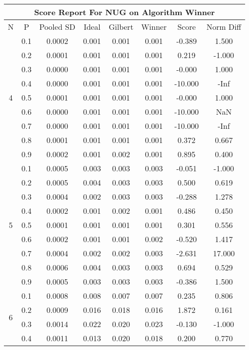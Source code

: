 \documentclass[11pt,a4paper]{report}
\begin{document}
\begin{longtable}{ | c | c || c | c | c | c | c | c | }
\hline
\multicolumn{8}{|c|}{ Score Report For NUG on Algorithm Winner} \\
\hline
N & P & Pooled SD &  Ideal &  Gilbert & Winner  & Score & Norm Diff \\
 \hline
 \hline
 \endhead
\multirow{9}{*}{4} & 0.1 & 0.0002 & 0.001 & 0.001 & 0.001 & -0.389 & 1.500 \\
 & 0.2 & 0.0001 & 0.001 & 0.001 & 0.001 & 0.219 & -1.000 \\
 & 0.3 & 0.0000 & 0.001 & 0.001 & 0.001 & -0.000 & 1.000 \\
 & 0.4 & 0.0000 & 0.001 & 0.001 & 0.001 & -10.000 & -Inf \\
 & 0.5 & 0.0001 & 0.001 & 0.001 & 0.001 & -0.000 & 1.000 \\
 & 0.6 & 0.0000 & 0.001 & 0.001 & 0.001 & -10.000 & NaN \\
 & 0.7 & 0.0000 & 0.001 & 0.001 & 0.001 & -10.000 & -Inf \\
 & 0.8 & 0.0001 & 0.001 & 0.001 & 0.001 & 0.372 & 0.667 \\
 & 0.9 & 0.0002 & 0.001 & 0.002 & 0.001 & 0.895 & 0.400 \\
 \hline
\multirow{9}{*}{5} & 0.1 & 0.0005 & 0.003 & 0.003 & 0.003 & -0.051 & -1.000 \\
 & 0.2 & 0.0005 & 0.004 & 0.003 & 0.003 & 0.500 & 0.619 \\
 & 0.3 & 0.0004 & 0.002 & 0.003 & 0.003 & -0.288 & 1.278 \\
 & 0.4 & 0.0002 & 0.001 & 0.002 & 0.001 & 0.486 & 0.450 \\
 & 0.5 & 0.0001 & 0.001 & 0.001 & 0.001 & 0.301 & 0.556 \\
 & 0.6 & 0.0002 & 0.001 & 0.001 & 0.002 & -0.520 & 1.417 \\
 & 0.7 & 0.0004 & 0.002 & 0.002 & 0.003 & -2.631 & 17.000 \\
 & 0.8 & 0.0006 & 0.004 & 0.003 & 0.003 & 0.694 & 0.529 \\
 & 0.9 & 0.0005 & 0.003 & 0.003 & 0.003 & -0.386 & 1.500 \\
 \hline
\multirow{9}{*}{6} & 0.1 & 0.0008 & 0.008 & 0.007 & 0.007 & 0.235 & 0.806 \\
 & 0.2 & 0.0009 & 0.016 & 0.018 & 0.016 & 1.872 & 0.161 \\
 & 0.3 & 0.0014 & 0.022 & 0.020 & 0.023 & -0.130 & -1.000 \\
 & 0.4 & 0.0011 & 0.013 & 0.020 & 0.018 & 0.200 & 0.770 \\

\end{longtable}
\end{document}
